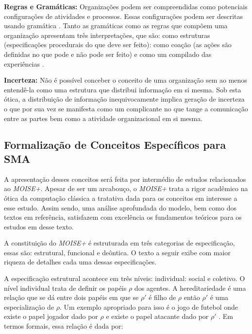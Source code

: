 \textbf{Regras e Gramáticas:} Organizações podem ser compreendidas como potenciais configurações de atividades e processos. Essas configurações podem ser descritas usando gramática \cite{grammarselforganizationmodel} \cite{grammarselforganizationmodel2}. Tanto as gramáticas como as regras que compõem uma organização apresentam três interpretações, que são: como estruturas (especificações procedurais do que deve ser feito): como coação (as ações são definidas no que pode e não pode ser feito) e como um compilado das experiências \cite{organiationofmultiagentsystem}.

\textbf{Incerteza:} Não é possível conceber o conceito de uma organização sem ao menos entendê-la como uma estrutura que distribui informação em si mesma. Sob esta ótica, a distribuição de informação inequivocamente implica geração de incerteza o que por sua vez se manifesta como um complicante no que tange a comunicação entre as partes bem como a atividade organizacional em si mesma.

\subsection{Formalização de Conceitos Específicos para SMA}
\label{moiseformalizesma}
A apresentação desses conceitos será feita por intermédio de estudos relacionados ao \textit{MOISE+}. Apesar de ser um arcabouço, o \textit{MOISE+} trata a rigor acadêmico na ótica da computação clássica a tratativa dada para os conceitos em interesse a esse estudo. Assim sendo, uma análise aprofundada do modelo, bem como dos textos em referência, satisfazem com excelência os fundamentos teóricos para os estudos em desse texto. 

A constituição do \textit{MOISE+} é estruturada em três categorias de especificação, essas são: estrutural, funcional e deôntica. O texto a seguir exibe com maior riqueza de detalhes cada uma dessas especificações.  

A especificação estrutural acontece em três níveis: individual: social e coletivo. O nível individual trata de definir os papéis $\rho$ dos agentes. A hereditariedade é uma relação que se dá entre dois papéis em que se $\rho'$ é filho de $\rho$ então $\rho'$ é uma especialização de $\rho$. Um exemplo apropriado para isso é o jogo de futebol onde existe o papel jogador dado por $\rho$ e existe o papel atacante dado por $\rho'$ \cite{moiseframework} \cite{roleone} \cite{roletwo} \cite{dynamicagenttemporalstruct}. Em termos formais, essa relação é dada por: 

